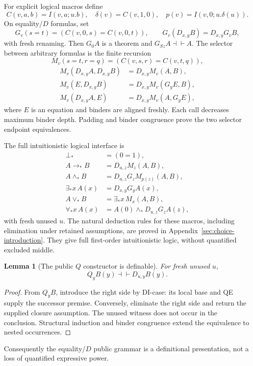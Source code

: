 \documentclass[11pt]{article}
\newtheorem{lemma}[theorem]{Lemma}
\theoremstyle{definition}\newtheorem{definition}[theorem]{Definition}
\theoremstyle{remark}\newtheorem{remark}[theorem]{Remark}
\begin{document}
For explicit logical macros define
\[
 C(v,a,b)=I(v,a;u.b),\quad
 \delta(v)=C(v,1,0),\quad p(v)=I(v,0;u.\delta(u)).
\]
On equality/$D$ formulas, set
\[
G_v(s=t)=(C(v,0,s)=C(v,0,t)),\qquad
G_v(D_{x,y}B)=D_{x,y}G_vB,
\]
with fresh renaming. Then $G_0A$ is a theorem and
$G_{Sz}A\dashv\vdash A$.
The selector between arbitrary formulas is the finite recursion
\[
 M_v(s=t,r=q)=(C(v,s,r)=C(v,t,q)),
\]
\[
\begin{aligned}
M_v(D_{x,y}A,D_{x,y}B)&=D_{x,y}M_v(A,B),\\
M_v(E,D_{x,y}B)&=D_{x,y}M_v(G_yE,B),\\
M_v(D_{x,y}A,E)&=D_{x,y}M_v(A,G_yE),
\end{aligned}
\]
where $E$ is an equation and binders are aligned freshly.
Each call decreases maximum binder depth. Padding and binder
congruence prove the two selector endpoint equivalences.

The full intuitionistic logical interface is
\[
\begin{aligned}
\bot_*&=(0=1),\\
A\to_*B&=D_{u,z}M_z(A,B),\\
A\wedge_*B&=D_{u,z}G_zM_{p(z)}(A,B),\\
\exists_*x\,A(x)&=D_{x,y}G_yA(x),\\
A\vee_*B&=\exists_*x\,M_x(A,B),\\
\forall_*x\,A(x)&=A(0)\wedge_*D_{u,z}G_zA(z),
\end{aligned}
\tag{Macros}
\]
with fresh unused $u$. The natural deduction rules for these macros,
including elimination under retained assumptions, are proved in
Appendix~\ref{sec:choice-introduction}. They give full first-order
intuitionistic logic, without quantified excluded middle.

\begin{lemma}[The public $Q$ constructor is definable]
For fresh unused $u$,
\[
                        Q_yB(y)\dashv\vdash D_{u,y}B(y).
\]
\end{lemma}
\begin{proof}
From $Q_yB$, introduce the right side by DI-case: its local base and
QE supply the successor premise. Conversely, eliminate the right
side and return the supplied closure assumption. The unused witness
does not occur in the conclusion. Structural induction and binder
congruence extend the equivalence to nested occurrences.
\end{proof}
Consequently the equality/$D$ public grammar is a definitional
presentation, not a loss of quantified expressive power.
\end{document}
